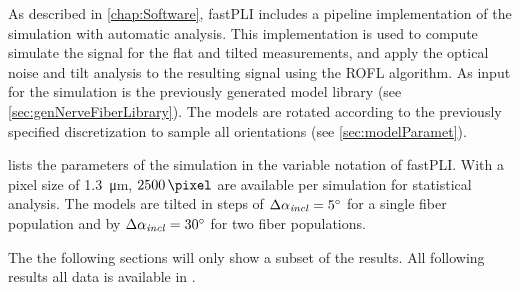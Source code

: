 %
As described in \cref{chap:Software}, \ac{fastPLI} includes a pipeline implementation of the simulation with automatic analysis.
This implementation is used to compute simulate the signal for the flat and tilted measurements, and apply the optical noise and tilt analysis to the resulting signal using the \ac{ROFL} algorithm. 
As input for the simulation is the previously generated model library (see \cref{sec:genNerveFiberLibrary}).
The models are rotated according to the previously specified discretization to sample all orientations (see \cref{sec:modelParamet}).
\par
% 
 lists the parameters of the simulation in the variable notation of \ac{fastPLI}.
With a pixel size of \SI{1.3}{\micro\meter}, $\SI{2500}{\pixel}$ are available per simulation for statistical analysis.
The models are tilted in steps of $\Delta \textnormal{$\alpha_{\mathit{incl}}$} = \SI{5}{\degree}$ for a single fiber population and by $\Delta \textnormal{$\alpha_{\mathit{incl}}$} = \SI{30}{\degree}$ for two fiber populations.
\par
% 
The the following sections will only show a subset of the results. 
All following results all data is available in \dummy{}.
% 
% 
% 
